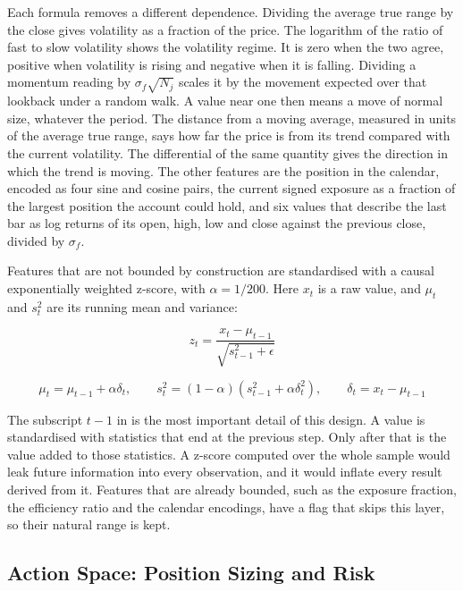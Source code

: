 Each formula removes a different dependence. Dividing the average true range by the close gives volatility as a fraction of the price. The logarithm of the ratio of fast to slow volatility shows the volatility regime. It is zero when the two agree, positive when volatility is rising and negative when it is falling. Dividing a momentum reading by $\sigma_f \sqrt{N_j}$ scales it by the movement expected over that lookback under a random walk. A value near one then means a move of normal size, whatever the period. The distance from a moving average, measured in units of the average true range, says how far the price is from its trend compared with the current volatility. The differential of the same quantity gives the direction in which the trend is moving. The other features are the position in the calendar, encoded as four sine and cosine pairs, the current signed exposure as a fraction of the largest position the account could hold, and six values that describe the last bar as log returns of its open, high, low and close against the previous close, divided by $\sigma_f$.

Features that are not bounded by construction are standardised with a causal exponentially weighted z-score, with $\alpha = 1/200$. Here $x_t$ is a raw value, and $\mu_t$ and $s^2_t$ are its running mean and variance:

\begin{equation}
z_t = \frac{x_t - \mu_{t-1}}{\sqrt{s^2_{t-1} + \epsilon}}
\label{Equation:Normalisation}
\end{equation}

\begin{equation}
\mu_t = \mu_{t-1} + \alpha \delta_t, \qquad s^2_t = (1 - \alpha)\left(s^2_{t-1} + \alpha \delta_t^2\right), \qquad \delta_t = x_t - \mu_{t-1}
\label{Equation:NormalisationUpdate}
\end{equation}

The subscript $t-1$ in  is the most important detail of this design. A value is standardised with statistics that end at the previous step. Only after that is the value added to those statistics. A z-score computed over the whole sample would leak future information into every observation, and it would inflate every result derived from it. Features that are already bounded, such as the exposure fraction, the efficiency ratio and the calendar encodings, have a flag that skips this layer, so their natural range is kept.

\subsection{Action Space: Position Sizing and Risk}

